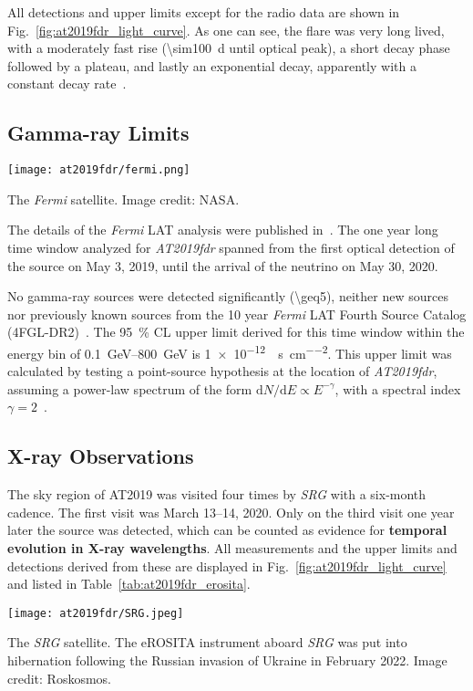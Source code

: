 All detections and upper limits except for the radio data are shown in Fig.~\ref{fig:at2019fdr_light_curve}. As one can see, the flare was very long lived, with a moderately fast rise (\SI{\sim100}{\day} until optical peak), a short decay phase followed by a plateau, and lastly an exponential decay, apparently with a constant decay rate~.

\subsection{Gamma-ray Limits}

\begin{marginfigure}
    \texttt{[image: at2019fdr/fermi.png]}
    \caption[The \textit{Fermi} satellite]{The \textit{Fermi} satellite. Image credit: NASA.}
\end{marginfigure}

The details of the \textit{Fermi} LAT analysis were published in~. The one year long time window analyzed for \emph{AT2019fdr} spanned from the first optical detection of the source on May 3, 2019, until the arrival of the neutrino on May 30, 2020.

No gamma-ray sources were detected significantly (\SI{\geq5}{\sigma}), neither new sources nor previously known sources from the 10 year \textit{Fermi} LAT Fourth Source Catalog (4FGL-DR2)~. The \SI{95}{\percent} CL upper limit derived for this time window within the energy bin of \SIrange{0.1}{800}{\giga\eV} is \SI{1e-12}{\erg\per\s\per\square\cm}. This upper limit was calculated by testing a point-source hypothesis at the location of \emph{AT2019fdr}, assuming a power-law spectrum of the form $\text{d}N/\text{d}E \propto E^{-\gamma}$, with a spectral index $\gamma=2$~\cite{Velzen2021}.

\subsection{X-ray Observations}\label{x_ray_obs}
The sky region of AT2019 was visited four times by \textit{SRG} with a six-month cadence. The first visit was March 13--14, 2020. Only on the third visit one year later the source was detected, which can be counted as evidence for \textbf{temporal evolution in X-ray wavelengths}. All measurements and the upper limits and detections derived from these are displayed in Fig.~\ref{fig:at2019fdr_light_curve} and listed in Table~\ref{tab:at2019fdr_erosita}.
\begin{marginfigure}
    \texttt{[image: at2019fdr/SRG.jpeg]}
    \caption[The \textit{SRG} satellite]{The \textit{SRG} satellite. The eROSITA instrument aboard \textit{SRG} was put into hibernation following the Russian invasion of Ukraine in February 2022. Image credit: Roskosmos.}
\end{marginfigure}

